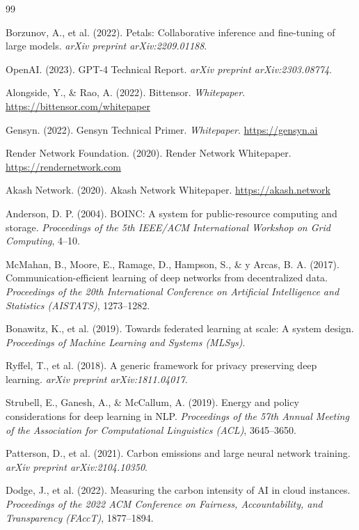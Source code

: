 \documentclass[12pt]{article}
\begin{document}

\begin{thebibliography}{99}

Borzunov, A., et al. (2022). Petals: Collaborative inference and fine-tuning of large models. \textit{arXiv preprint arXiv:2209.01188}.

OpenAI. (2023). GPT-4 Technical Report. \textit{arXiv preprint arXiv:2303.08774}.

Alongside, Y., \& Rao, A. (2022). Bittensor. \textit{Whitepaper}. \url{https://bittensor.com/whitepaper}

Gensyn. (2022). Gensyn Technical Primer. \textit{Whitepaper}. \url{https://gensyn.ai}

Render Network Foundation. (2020). Render Network Whitepaper. \url{https://rendernetwork.com}

Akash Network. (2020). Akash Network Whitepaper. \url{https://akash.network}

Anderson, D. P. (2004). BOINC: A system for public-resource computing and storage. \textit{Proceedings of the 5th IEEE/ACM International Workshop on Grid Computing}, 4--10.

McMahan, B., Moore, E., Ramage, D., Hampson, S., \& y Arcas, B. A. (2017). Communication-efficient learning of deep networks from decentralized data. \textit{Proceedings of the 20th International Conference on Artificial Intelligence and Statistics (AISTATS)}, 1273--1282.

Bonawitz, K., et al. (2019). Towards federated learning at scale: A system design. \textit{Proceedings of Machine Learning and Systems (MLSys)}.

Ryffel, T., et al. (2018). A generic framework for privacy preserving deep learning. \textit{arXiv preprint arXiv:1811.04017}.

Strubell, E., Ganesh, A., \& McCallum, A. (2019). Energy and policy considerations for deep learning in NLP. \textit{Proceedings of the 57th Annual Meeting of the Association for Computational Linguistics (ACL)}, 3645--3650.

Patterson, D., et al. (2021). Carbon emissions and large neural network training. \textit{arXiv preprint arXiv:2104.10350}.

Dodge, J., et al. (2022). Measuring the carbon intensity of AI in cloud instances. \textit{Proceedings of the 2022 ACM Conference on Fairness, Accountability, and Transparency (FAccT)}, 1877--1894.

\end{thebibliography}
\end{document}
